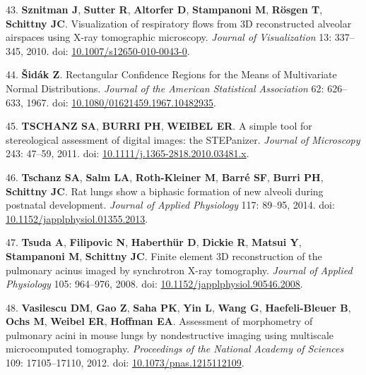 \documentclass[
  american,
]{article}
\newenvironment{cslreferences}%
  {}%
  {\par}
\begin{document}
\begin{cslreferences}
\leavevmode\hypertarget{ref-eioib1TQ}{}%
43. \textbf{Sznitman J}, \textbf{Sutter R}, \textbf{Altorfer D}, \textbf{Stampanoni M}, \textbf{Rösgen T}, \textbf{Schittny JC}. Visualization of respiratory flows from 3D reconstructed alveolar airspaces using X-ray tomographic microscopy. \emph{Journal of Visualization} 13: 337--345, 2010. doi: \href{https://doi.org/10.1007/s12650-010-0043-0}{10.1007/s12650-010-0043-0}.

\leavevmode\hypertarget{ref-GtCynqsI}{}%
44. \textbf{Šidák Z}. Rectangular Confidence Regions for the Means of Multivariate Normal Distributions. \emph{Journal of the American Statistical Association} 62: 626--633, 1967. doi: \href{https://doi.org/10.1080/01621459.1967.10482935}{10.1080/01621459.1967.10482935}.

\leavevmode\hypertarget{ref-nPoQ2EIB}{}%
45. \textbf{TSCHANZ SA}, \textbf{BURRI PH}, \textbf{WEIBEL ER}. A simple tool for stereological assessment of digital images: the STEPanizer. \emph{Journal of Microscopy} 243: 47--59, 2011. doi: \href{https://doi.org/10.1111/j.1365-2818.2010.03481.x}{10.1111/j.1365-2818.2010.03481.x}.

\leavevmode\hypertarget{ref-wnl86DEM}{}%
46. \textbf{Tschanz SA}, \textbf{Salm LA}, \textbf{Roth-Kleiner M}, \textbf{Barré SF}, \textbf{Burri PH}, \textbf{Schittny JC}. Rat lungs show a biphasic formation of new alveoli during postnatal development. \emph{Journal of Applied Physiology} 117: 89--95, 2014. doi: \href{https://doi.org/10.1152/japplphysiol.01355.2013}{10.1152/japplphysiol.01355.2013}.

\leavevmode\hypertarget{ref-OT4s1CSX}{}%
47. \textbf{Tsuda A}, \textbf{Filipovic N}, \textbf{Haberthür D}, \textbf{Dickie R}, \textbf{Matsui Y}, \textbf{Stampanoni M}, \textbf{Schittny JC}. Finite element 3D reconstruction of the pulmonary acinus imaged by synchrotron X-ray tomography. \emph{Journal of Applied Physiology} 105: 964--976, 2008. doi: \href{https://doi.org/10.1152/japplphysiol.90546.2008}{10.1152/japplphysiol.90546.2008}.

\leavevmode\hypertarget{ref-C6OaY84D}{}%
48. \textbf{Vasilescu DM}, \textbf{Gao Z}, \textbf{Saha PK}, \textbf{Yin L}, \textbf{Wang G}, \textbf{Haefeli-Bleuer B}, \textbf{Ochs M}, \textbf{Weibel ER}, \textbf{Hoffman EA}. Assessment of morphometry of pulmonary acini in mouse lungs by nondestructive imaging using multiscale microcomputed tomography. \emph{Proceedings of the National Academy of Sciences} 109: 17105--17110, 2012. doi: \href{https://doi.org/10.1073/pnas.1215112109}{10.1073/pnas.1215112109}.


\end{cslreferences}
\end{document}
